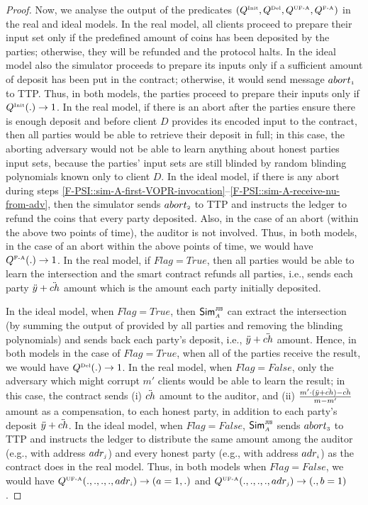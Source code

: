 \begin{proof}
Now, we analyse the output of the predicates $(Q^{\scriptscriptstyle \text{Init}}, Q^{\scriptscriptstyle \text{Del}}, Q^{\scriptscriptstyle \text{UF-A}}, Q^{\scriptscriptstyle \text{F-A}})$ in the real and ideal models. In the real model, all clients proceed to prepare their input set only if the predefined amount of coins has been deposited by the parties; otherwise, they will be refunded and the protocol halts. In the ideal model also the simulator proceeds to prepare its inputs only if a sufficient amount of deposit has been put in the contract; otherwise, it would send message $abort_{\scriptscriptstyle 1}$ to TTP. Thus, in both models, the parties proceed to prepare their inputs only if $Q^{\scriptscriptstyle \text{Init}}(.) \rightarrow1$. 
%
In the real model, if there is an abort after the parties ensure there is enough deposit and before client $D$ provides its encoded input to the contract, then all parties would be able to retrieve their deposit in full; in this case, the aborting adversary would not be able to learn anything about honest parties input sets, because the parties' input sets are still blinded by random blinding polynomials known only to client $D$. In the ideal model, if there is any abort during steps \ref{F-PSI::sim-A-first-VOPR-invocation}--\ref{F-PSI::sim-A-receive-nu-from-adv}, then the simulator sends $abort_{\scriptscriptstyle 2}$ to TTP and instructs the ledger to refund the coins that every party deposited. Also, in the case of an abort (within the above two points of time), the auditor is not involved. Thus, in both models,  in the case of an abort within the above points of time, we would have $Q^{\scriptscriptstyle \text{F-A}}(.)\rightarrow1$. In the real model, if $Flag=True$, then all parties would be able to learn the intersection and the smart contract refunds all parties, i.e., sends each party $\ddot{y}+\ddot{ch}$ amount which is the amount each party initially deposited. 

In the ideal model, when $Flag=True$, then $\mathsf{Sim}^{\scriptscriptstyle \mathtt{JUS}}_{\scriptscriptstyle A}$ can extract the intersection (by summing the output of \vopr provided by all parties and removing the blinding polynomials) and sends back each party's deposit, i.e., $\ddot{y}+\ddot{ch}$ amount. Hence, in both models in the case of $Flag=True$, when all of the parties receive the result, we would have $Q^{\scriptscriptstyle \text{Del}}(.)\rightarrow 1$. In the real model, when $Flag=False$, only the adversary which might corrupt $m'$ clients would be able to learn the result; in this case, the contract sends (i) $\ddot{ch}$ amount to the auditor, and (ii) $\frac{m'\cdot (\ddot{y}+\ddot{ch})-\ddot{ch}}{m-m'}$ amount as a compensation, to each honest party, in addition to each party's deposit $\ddot{y}+\ddot{ch}$. In the ideal model,  when $Flag=False$, $\mathsf{Sim}^{\scriptscriptstyle \mathtt{JUS}}_{\scriptscriptstyle A}$  sends $abort_{\scriptscriptstyle 3}$ to TTP and instructs the ledger to distribute the same amount among the auditor (e.g., with address $adr_{\scriptscriptstyle j}$) and every honest party (e.g., with address $adr_{\scriptscriptstyle i}$) as the contract does in the real model. Thus, in both models when $Flag=False$, we would have $Q^{\scriptscriptstyle \text{UF-A}}(., ., ., ., adr_{\scriptscriptstyle i})\rightarrow (a=1, .)$ and  $Q^{\scriptscriptstyle \text{UF-A}}(., ., ., ., adr_{\scriptscriptstyle j})\rightarrow (., b=1)$. 


\end{proof}
